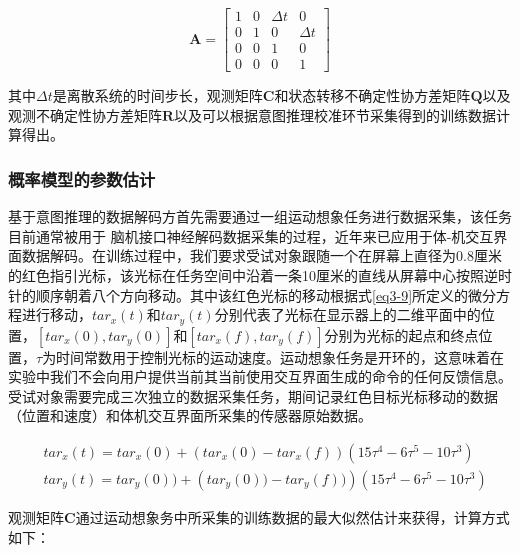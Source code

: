 \begin{equation}
\mathbf{A} = 
\begin{bmatrix}{}
1&0&{\Delta t}&0  \\  
0&1&0&{\Delta t}  \\  
0&0&1&0  \\  
0&0&0&1 
\end{bmatrix}
\end{equation} 

其中$\Delta t$是离散系统的时间步长，观测矩阵${\boldsymbol{C}}$和状态转移不确定性协方差矩阵${{\boldsymbol{Q}}}$以及观测不确定性协方差矩阵${{\boldsymbol{R}}}$以及可以根据意图推理校准环节采集得到的训练数据计算得出。


\subsubsection{概率模型的参数估计}基于意图推理的数据解码方首先需要通过一组运动想象任务进行数据采集，该任务目前通常被用于 脑机接口神经解码数据采集的过程\cite{malikEfficientDecodingSteadyState2011,brandmanRapidCalibrationIntracortical2018}，近年来已应用于体-机交互界面数据解码\cite{seanez-gonzalezCursorControlKalman2014,seanez-gonzalezStaticDynamicDecoding2017}。在训练过程中，我们要求受试对象跟随一个在屏幕上直径为0.8厘米的红色指引光标，该光标在任务空间中沿着一条10厘米的直线从屏幕中心按照逆时针的顺序朝着八个方向移动。其中该红色光标的移动根据式\ref{eq3-9}所定义的微分方程进行移动\cite{seanez-gonzalezStaticDynamicDecoding2017}，$tar_x(t)$和$tar_y(t)$分别代表了光标在显示器上的二维平面中的位置，$[tar_x(0),tar_y(0)]$和$[tar_x(f),tar_y(f)]$分别为光标的起点和终点位置，$\tau$为时间常数用于控制光标的运动速度。运动想象任务是开环的，这意味着在实验中我们不会向用户提供当前其当前使用交互界面生成的命令的任何反馈信息。受试对象需要完成三次独立的数据采集任务，期间记录红色目标光标移动的数据（位置和速度）和体机交互界面所采集的传感器原始数据。

\begin{equation}
    \begin{aligned}
    & tar_x(t)=tar_x(0)+\left(tar_x(0)-tar_x(f)\right)\left(15 \tau^4-6 \tau^5-10 \tau^3\right) \\
    & tar_y(t)= tar_y(0))+\left(tar_y(0))- tar_y(f))\right)\left(15 \tau^4-6 \tau^5-10 \tau^3\right)
    \end{aligned}
    \label{eq3-9}
\end{equation}

观测矩阵${\boldsymbol{C}}$通过运动想象务中所采集的训练数据的最大似然估计来获得，计算方式如下：

